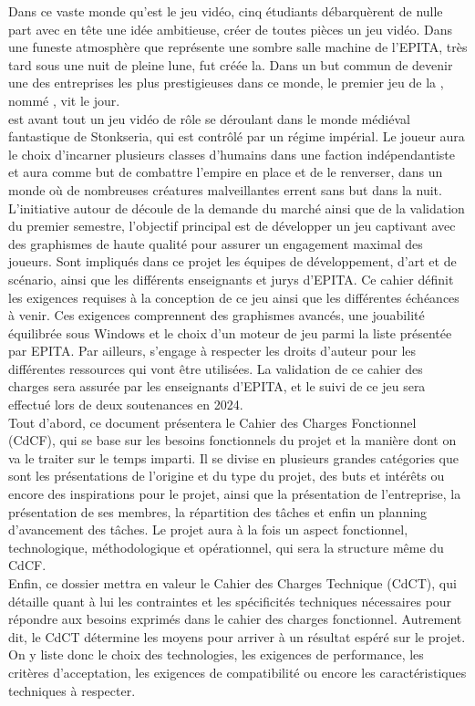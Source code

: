 
Dans ce vaste monde qu’est le jeu vidéo, cinq étudiants débarquèrent de nulle part avec en tête une idée ambitieuse, créer de toutes pièces un jeu vidéo.
Dans une funeste atmosphère que représente une sombre salle machine de l’EPITA, très tard sous une nuit de pleine lune, fut créée la\textit{\companyName}.
Dans un but commun de devenir une des entreprises les plus prestigieuses dans ce monde, le premier jeu de la \textit{\companyName}, nommé \textit{\gameName}, vit le jour.
\\

\textit{\gameName} est avant tout un jeu vidéo de rôle se déroulant dans le monde médiéval fantastique de Stonkseria, qui est contrôlé par un régime impérial.
Le joueur aura le choix d’incarner plusieurs classes d’humains dans une faction indépendantiste et aura comme but de combattre l’empire en place et de le renverser, dans un monde où de nombreuses créatures malveillantes errent sans but dans la nuit.
\\

L'initiative autour de \textit{\gameName} découle de la demande du marché ainsi que de la validation du premier semestre, l’objectif principal est de développer un jeu captivant avec des graphismes de haute qualité pour assurer un engagement maximal des joueurs.
Sont impliqués dans ce projet les équipes de développement, d’art et de scénario, ainsi que les différents enseignants et jurys d’EPITA.
Ce cahier définit les exigences requises à la conception de ce jeu ainsi que les différentes échéances à venir.
Ces exigences comprennent des graphismes avancés, une jouabilité équilibrée sous Windows et le choix d’un moteur de jeu parmi la liste présentée par EPITA.
Par ailleurs, \textit{\companyName} s’engage à respecter les droits d’auteur pour les différentes ressources qui vont être utilisées.
La validation de ce cahier des charges sera assurée par les enseignants d’EPITA, et le suivi de ce jeu sera effectué lors de deux soutenances en 2024.
\\

Tout d’abord, ce document présentera le Cahier des Charges Fonctionnel (CdCF), qui se base sur les besoins fonctionnels du projet et la manière dont on va le traiter sur le temps imparti.
Il se divise en plusieurs grandes catégories que sont les présentations de l’origine et du type du projet, des buts et intérêts ou encore des inspirations pour le projet, ainsi que la présentation de l’entreprise, la présentation de ses membres, la répartition des tâches et enfin un planning d’avancement des tâches.
Le projet aura à la fois un aspect fonctionnel, technologique, méthodologique et opérationnel, qui sera la structure même du CdCF.
\\

Enfin, ce dossier mettra en valeur le Cahier des Charges Technique (CdCT), qui détaille quant à lui les contraintes et les spécificités techniques nécessaires pour répondre aux besoins exprimés dans le cahier des charges fonctionnel.
Autrement dit, le CdCT détermine les moyens pour arriver à un résultat espéré sur le projet.
On y liste donc le choix des technologies, les exigences de performance, les critères d'acceptation, les exigences de compatibilité ou encore les caractéristiques techniques à respecter.
